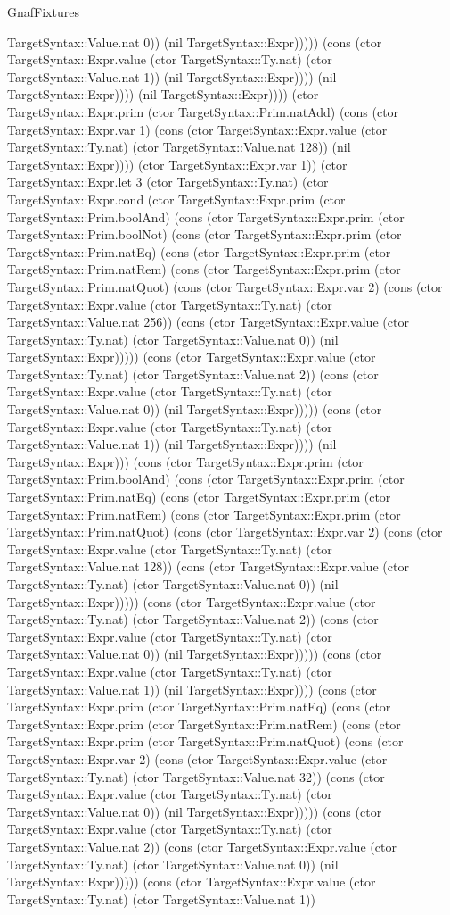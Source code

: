 \begin{lexlean}{GnafFixtures}
\begin{semanticmodule}
{TargetSyntax::Value.nat 0)) (nil TargetSyntax::Expr))))) (cons (ctor TargetSyntax::Expr.value (ctor TargetSyntax::Ty.nat) (ctor TargetSyntax::Value.nat 1)) (nil TargetSyntax::Expr)))) (nil TargetSyntax::Expr)))) (nil TargetSyntax::Expr)))) (ctor TargetSyntax::Expr.prim (ctor TargetSyntax::Prim.natAdd) (cons (ctor TargetSyntax::Expr.var 1) (cons (ctor TargetSyntax::Expr.value (ctor TargetSyntax::Ty.nat) (ctor TargetSyntax::Value.nat 128)) (nil TargetSyntax::Expr)))) (ctor TargetSyntax::Expr.var 1)) (ctor TargetSyntax::Expr.let 3 (ctor TargetSyntax::Ty.nat) (ctor TargetSyntax::Expr.cond (ctor TargetSyntax::Expr.prim (ctor TargetSyntax::Prim.boolAnd) (cons (ctor TargetSyntax::Expr.prim (ctor TargetSyntax::Prim.boolNot) (cons (ctor TargetSyntax::Expr.prim (ctor TargetSyntax::Prim.natEq) (cons (ctor TargetSyntax::Expr.prim (ctor TargetSyntax::Prim.natRem) (cons (ctor TargetSyntax::Expr.prim (ctor TargetSyntax::Prim.natQuot) (cons (ctor TargetSyntax::Expr.var 2) (cons (ctor TargetSyntax::Expr.value (ctor TargetSyntax::Ty.nat) (ctor TargetSyntax::Value.nat 256)) (cons (ctor TargetSyntax::Expr.value (ctor TargetSyntax::Ty.nat) (ctor TargetSyntax::Value.nat 0)) (nil TargetSyntax::Expr))))) (cons (ctor TargetSyntax::Expr.value (ctor TargetSyntax::Ty.nat) (ctor TargetSyntax::Value.nat 2)) (cons (ctor TargetSyntax::Expr.value (ctor TargetSyntax::Ty.nat) (ctor TargetSyntax::Value.nat 0)) (nil TargetSyntax::Expr))))) (cons (ctor TargetSyntax::Expr.value (ctor TargetSyntax::Ty.nat) (ctor TargetSyntax::Value.nat 1)) (nil TargetSyntax::Expr)))) (nil TargetSyntax::Expr))) (cons (ctor TargetSyntax::Expr.prim (ctor TargetSyntax::Prim.boolAnd) (cons (ctor TargetSyntax::Expr.prim (ctor TargetSyntax::Prim.natEq) (cons (ctor TargetSyntax::Expr.prim (ctor TargetSyntax::Prim.natRem) (cons (ctor TargetSyntax::Expr.prim (ctor TargetSyntax::Prim.natQuot) (cons (ctor TargetSyntax::Expr.var 2) (cons (ctor TargetSyntax::Expr.value (ctor TargetSyntax::Ty.nat) (ctor TargetSyntax::Value.nat 128)) (cons (ctor TargetSyntax::Expr.value (ctor TargetSyntax::Ty.nat) (ctor TargetSyntax::Value.nat 0)) (nil TargetSyntax::Expr))))) (cons (ctor TargetSyntax::Expr.value (ctor TargetSyntax::Ty.nat) (ctor TargetSyntax::Value.nat 2)) (cons (ctor TargetSyntax::Expr.value (ctor TargetSyntax::Ty.nat) (ctor TargetSyntax::Value.nat 0)) (nil TargetSyntax::Expr))))) (cons (ctor TargetSyntax::Expr.value (ctor TargetSyntax::Ty.nat) (ctor TargetSyntax::Value.nat 1)) (nil TargetSyntax::Expr)))) (cons (ctor TargetSyntax::Expr.prim (ctor TargetSyntax::Prim.natEq) (cons (ctor TargetSyntax::Expr.prim (ctor TargetSyntax::Prim.natRem) (cons (ctor TargetSyntax::Expr.prim (ctor TargetSyntax::Prim.natQuot) (cons (ctor TargetSyntax::Expr.var 2) (cons (ctor TargetSyntax::Expr.value (ctor TargetSyntax::Ty.nat) (ctor TargetSyntax::Value.nat 32)) (cons (ctor TargetSyntax::Expr.value (ctor TargetSyntax::Ty.nat) (ctor TargetSyntax::Value.nat 0)) (nil TargetSyntax::Expr))))) (cons (ctor TargetSyntax::Expr.value (ctor TargetSyntax::Ty.nat) (ctor TargetSyntax::Value.nat 2)) (cons (ctor TargetSyntax::Expr.value (ctor TargetSyntax::Ty.nat) (ctor TargetSyntax::Value.nat 0)) (nil TargetSyntax::Expr))))) (cons (ctor TargetSyntax::Expr.value (ctor TargetSyntax::Ty.nat) (ctor TargetSyntax::Value.nat 1)) }
\end{semanticmodule}
\end{lexlean}
